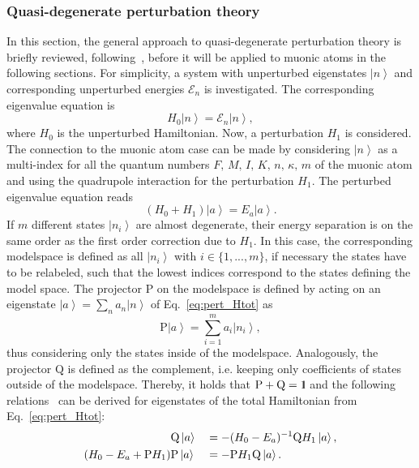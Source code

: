 \subsubsection{Quasi-degenerate perturbation theory}
\label{sec:almostDeg}
In this section, the general approach to quasi-degenerate perturbation theory is briefly reviewed, following~\cite{BorieRinker1982,sakurai1994}, before it will be applied to muonic atoms in the following sections. For simplicity, a system with unperturbed eigenstates $\left|n\right>$ and corresponding unperturbed energies $\mathcal{E}_n$ is investigated. The corresponding eigenvalue equation is
\begin{equation}
H_0 \left|n\right> = \mathcal{E}_n \left|n\right>,
\end{equation}
where $H_0$ is the unperturbed Hamiltonian. Now, a perturbation $H_1$ is considered.
The connection to the muonic atom case can be made by considering $\left|n\right>$ as a multi-index for all the quantum numbers $F,\,M,\,I,\,K,\,n,\,\kappa,\,m$ of the muonic atom and using the quadrupole interaction for the perturbation $H_1$. The perturbed eigenvalue equation reads
\begin{equation}
\label{eq:pert_Htot}
\left(H_0 + H_1\right) \left|a\right> = E_a \left|a\right>.
\end{equation}
If $m$ different states $\left| n_i \right>$ are almost degenerate, their energy separation is on the same order as the first order correction due to $H_1$. In this case, the corresponding modelspace is defined as all $\left| n_i \right>$ with $i\in \{1,...,m\}$, if necessary the states have to be relabeled, such that the lowest indices correspond to the states defining the model space.
The projector $\text{P}$ on the modelspace is defined by acting on an eigenstate $\left|a\right> = \sum_n a_n \left|n\right>$ of Eq.~\eqref{eq:pert_Htot} as
\begin{equation}
\text{P}\left|a\right> = \sum_{i=1}^m a_i \left|n_i\right>,
\end{equation}
thus considering only the states inside of the modelspace.
Analogously, the projector $\text{Q}$ is defined as the complement, i.e. keeping only coefficients of states outside of the modelspace. Thereby, it holds that $\text{P}+\text{Q}=\rm 1\hspace*{-0.4ex}\rule{0.1ex}{1.52ex}\hspace*{0.2ex}$ and the following relations~\cite{BorieRinker1982} can be derived for eigenstates of the total Hamiltonian from Eq.~\eqref{eq:pert_Htot}:
\begin{alignat}{2}
&\text{Q}\left|a\right> &&= - (H_0-E_a)^{-1}\text{Q}H_1 \left|a\right>,\notag\\
 (H_0-E_a+\text{P}H_1)&\text{P}\left|a\right>&&= -\text{P}H_1\text{Q}\left|a\right>.
\end{alignat}
